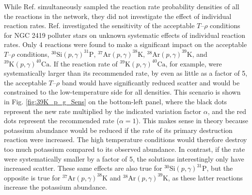 While Ref. \cite{Iliadis2016} simultaneously sampled the reaction rate probability densities of all the reactions in the network, they did not investigate the effect of individual reaction rates. Ref. \cite{Dermigny2017} investigated the sensitivity of the acceptable $T$--$\rho$ conditions for NGC 2419 polluter stars on unknown systematic effects of individual reaction rates. Only 4 reactions were found to make a significant impact on the acceptable $T$--$\rho$ conditions, $^{30}\mathrm{Si}(p,\gamma)^{31}\mathrm{P}$, $^{37}\mathrm{Ar}(p,\gamma)^{38}\mathrm{K}$, $^{38}\mathrm{Ar}(p,\gamma)^{39}\mathrm{K}$, and $^{39}\mathrm{K}(p,\gamma)^{40}\mathrm{Ca}$. If the reaction rate of $^{39}\mathrm{K}(p,\gamma)^{40}\mathrm{Ca}$, for example, were systematically larger than its recommended rate, by even as little as a factor of 5, the acceptable $T$--$\rho$ band would have significantly reduced scatter and would be constrained to the low-temperature side for all densities. This scenario is shown in Fig. \ref{fig:39K_p_g_Sens} on the bottom-left panel, where the black dots represent the new rate multiplied by the indicated variation factor $\alpha$, and the red dots represent the recommended rate ($\alpha = 1$). This makes sense in theory because potassium abundance would be reduced if the rate of its primary destruction reaction were increased. The high temperature conditions would therefore destroy too much potassium compared to its observed abundance. In contrast, if the rate were systematically smaller by a factor of 5, the solutions interestingly only have increased scatter. These same effects are also true for $^{30}\mathrm{Si}(p,\gamma)^{31}\mathrm{P}$, but the opposite is true for $^{37}\mathrm{Ar}(p,\gamma)^{38}\mathrm{K}$ and $^{38}\mathrm{Ar}(p,\gamma)^{39}\mathrm{K}$, as these latter reactions increase the potassium abundance.

